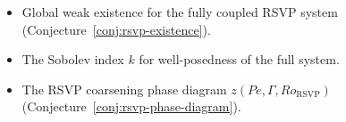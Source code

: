 \bigskip

\begin{tcolorbox}[title={\textbf{What Remains Open After This Part}},
  colback=boxorange,colframe=orange!60!black,fonttitle=\small\sffamily]
\begin{itemize}[leftmargin=1.5em,itemsep=2pt]
  \item Global weak existence for the fully coupled RSVP system
    (Conjecture~\ref{conj:rsvp-existence}).
  \item The Sobolev index $k$ for well-posedness of the full system.
  \item The RSVP coarsening phase diagram
    $z(Pe,\Gamma,Ro_{\mathrm{RSVP}})$
    (Conjecture~\ref{conj:rsvp-phase-diagram}).
\end{itemize}
\end{tcolorbox}

